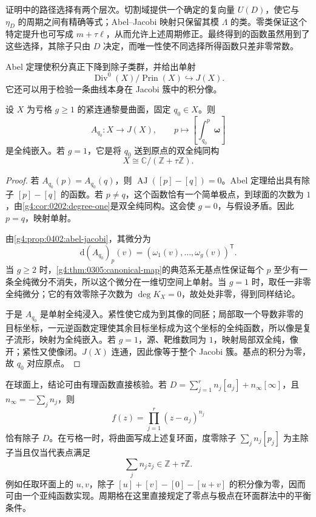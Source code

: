 证明中的路径选择有两个层次。切割域提供一个确定的复向量 \(U(D)\)，使它与 \(\eta_D\) 的周期之间有精确等式；Abel--Jacobi 映射只保留其模 \(\Lambda\) 的类。零类保证这个特定提升也可写成 \(m+\tau\ell\)，从而允许上述周期修正。最终得到的函数虽然用到了这些选择，其除子只由 \(D\) 决定，而唯一性使不同选择所得函数只差非零常数。

\ProseParagraphBreak

Abel 定理使积分真正下降到除子类群，并给出单射
\[
	\operatorname{Div}^0(X)/\operatorname{Prin}(X)
	\hookrightarrow J(X).
\]
它还可以用于检验一条曲线本身在 Jacobi 簇中的积分像。

\begin{corollary}
	\label{g4:cor:0403:abel-embedding}
	设 \(X\) 为亏格 \(g\ge1\) 的紧连通黎曼曲面，固定 \(q_0\in X\)。则
	\[
		A_{q_0}:X\longrightarrow J(X),\qquad
		p\longmapsto\left[\int_{q_0}^{p}\boldsymbol\omega\right]
	\]
	是全纯嵌入。若 \(g=1\)，它是将 \(q_0\) 送到原点的双全纯同构
	\[
		X\cong\mathbb C/(\mathbb Z+\tau\mathbb Z).
	\]
\end{corollary}
\begin{proof}
	若 \(A_{q_0}(p)=A_{q_0}(q)\)，则 \(\operatorname{AJ}([p]-[q])=0\)。Abel 定理给出具有除子 \([p]-[q]\) 的函数。若 \(p\ne q\)，这个函数恰有一个简单极点，到球面的次数为 \(1\)，由\cref{g4:cor:0202:degree-one}是双全纯同构。这会使 \(g=0\)，与假设矛盾。因此 \(p=q\)，映射单射。

	由\cref{g4:prop:0402:abel-jacobi}，其微分为
	\[
		\mathrm{d}(A_{q_0})_p(v)
		=(\omega_1(v),\ldots,\omega_g(v))^{\mathsf T}.
	\]
	当 \(g\ge2\) 时，\cref{g4:thm:0305:canonical-map}的典范系无基点性保证每个 \(p\) 至少有一条全纯微分不消失，所以这个微分在一维切空间上单射。当 \(g=1\) 时，取任一非零全纯微分；它的有效零除子次数为 \(\deg K_X=0\)，故处处非零，得到同样结论。

	于是 \(A_{q_0}\) 是单射全纯浸入。紧性使它成为到其像的同胚；局部取一个导数非零的目标坐标，一元逆函数定理使其余目标坐标成为这个坐标的全纯函数，所以像是复子流形，映射为全纯嵌入。若 \(g=1\)，源、靶维数同为 \(1\)，映射局部双全纯，像开；紧性又使像闭。\(J(X)\) 连通，因此像等于整个 Jacobi 簇。基点的积分为零，故 \(q_0\) 对应原点。
\end{proof}

在球面上，结论可由有理函数直接核验。若 \(D=\sum_{j=1}^r n_j[a_j]+n_\infty[\infty]\)，且 \(n_\infty=-\sum_jn_j\)，则
\[
	f(z)=\prod_{j=1}^r(z-a_j)^{n_j}
\]
恰有除子 \(D\)。在亏格一时，将曲面写成上述复环面，度零除子 \(\sum_j n_j[p_j]\) 为主除子当且仅当代表点满足
\[
	\sum_j n_j z_j\in\mathbb Z+\tau\mathbb Z.
\]
例如任取环面上的 \(u,v\)，除子 \([u]+[v]-[0]-[u+v]\) 的积分像为零，因而可由一个亚纯函数实现。周期格在这里直接规定了零点与极点在环面群法中的平衡条件。
